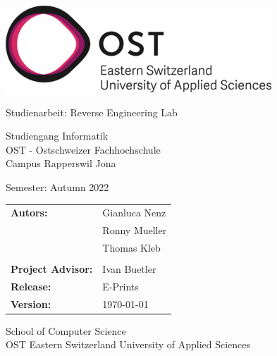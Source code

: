 \begin{titlepage}

    \begin{center}

        \includegraphics[height=0.15\textwidth, right]{resources/ost-logo.png}

        \vspace{1 cm}


        \vspace{0.5cm}

        {\Huge Studienarbeit: Reverse Engineering Lab}

        \vspace{0.5cm}

        

        \vspace{1 cm}

        Studiengang Informatik \\
        OST - Ostschweizer Fachhochschule \\
        Campus Rapperswil Jona \\

        \vspace{1 cm}

        Semester: Autumn 2022

        \vspace{1 cm}
        
        \begin{table}[h!]
            \centering
            \begin{tabular}{@{}ll}
                \textbf{Autors:}    & Gianluca Nenz \\
                                          & Ronny Mueller \\
                                          & Thomas Kleb \\
                                          &                    \\
                \textbf{Project Advisor:} & Ivan Buetler \\
                \textbf{Release:} & E-Prints \\
                \textbf{Version:} & \today
            \end{tabular}
        \end{table}
        

        \vfill


        \vspace{1cm}
        School of Computer Science\\
        OST Eastern Switzerland University of Applied Sciences

    \end{center}

\end{titlepage}
